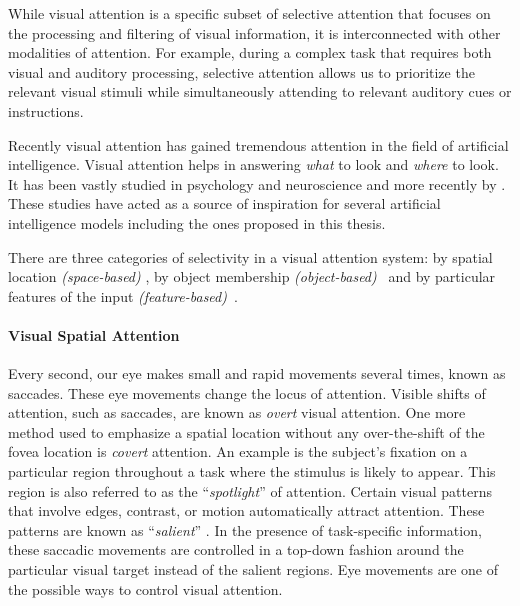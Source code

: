 While visual attention is a specific subset of selective attention that focuses on the processing and filtering of visual information, it is interconnected with other modalities of attention. For example, during a complex task that requires both visual and auditory processing, selective attention allows us to prioritize the relevant visual stimuli while simultaneously attending to relevant auditory cues or instructions.

Recently visual attention has gained tremendous attention in the field of artificial intelligence. 
Visual attention helps in answering \textit{what} to look and \textit{where} to look. It has been vastly studied in psychology and neuroscience \citep{posner1990attention,cohen1990control,phaf1990slam,bundesen1990theory,desimone1995neural,mozer1998computational,corbetta2002control,o2006making,petersen2012attention,moore2017neural} and more recently by \citet{flesch2022orthogonal,dekker2022curriculum}. These studies have acted as a source of inspiration for several artificial intelligence models \citep{khosla2007bio,lindsay2018biological} including the ones proposed in this thesis. 

There are three categories of selectivity in a visual attention system: by spatial location \textit{(space-based)} \citep{posner1980orienting,posner1982neural}, by object membership \textit{(object-based)}~\citep{duncan1984selective,egly1994shifting,vecera1994does,kramer1997object} and by particular features of the input \textit{(feature-based)}~\citep{harms1983color,driver1989movement,kramer1991perceptual,baylis1992visual,duncan1996objects}. 

\paragraph{Visual Spatial Attention}

Every second, our eye makes small and rapid movements several times, known as saccades. These eye movements change the locus of attention. Visible shifts of attention, such as saccades, are known as \textit{overt} visual attention. One more method used to emphasize a spatial location without any over-the-shift of the fovea location is \textit{covert} attention. An example is the subject's fixation on a particular region throughout a task where the stimulus is likely to appear. This region is also referred to as the ``\textit{spotlight}'' of attention. Certain visual patterns that involve edges, contrast, or motion automatically attract attention. These patterns are known as ``\textit{salient}'' \citep{itti2001computational}. In the presence of task-specific information, these saccadic movements are controlled in a top-down fashion around the particular visual target instead of the salient regions. Eye movements are one of the possible ways to control visual attention. 


